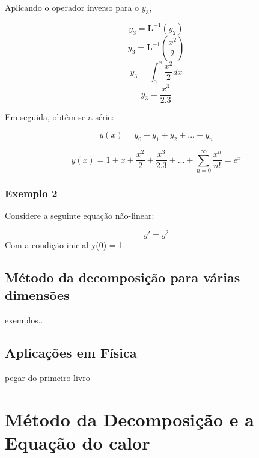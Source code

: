Aplicando o operador inverso para o $y_{3}$,

\begin{equation*}
  y_{3} = \textbf{L}^{-1} (y_{2})
\end{equation*}
\begin{equation*}
  y_{3} = \textbf{L}^{-1}\left(\frac{x^{2}}{2}\right)
\end{equation*}
\begin{equation*}
  y_{3} =\int_0^{x}\frac{x^{2}}{2}dx
\end{equation*}
\begin{equation*}
  y_{3} = \frac{x^{3}}{2.3}
\end{equation*}


Em seguida, obtêm-se a série:

\begin{equation*}
  y(x) = y_{0} +y_{1} + y_{2} + ... + y_{n} 
\end{equation*}

\begin{equation*}
  y(x) = 1 + x + \frac{x^{2}}{2} +  \frac{x^{3}}{2.3} + ...+ \sum_{n=0}^{\infty}\frac{x^{n}}{n!} = e^{x}
\end{equation*}

\subsection{Exemplo 2}


Considere a seguinte equação não-linear:

\begin{equation*}
  y' = y^{2}
\end{equation*}
Com a condição inicial y(0) = 1.

\section{Método da decomposição para várias dimensões}
exemplos..


\section{Aplicações em Física}

pegar do primeiro livro


\chapter[Método da Decomposição e a Equação do calor]{Método da Decomposição e a Equação do calor}

